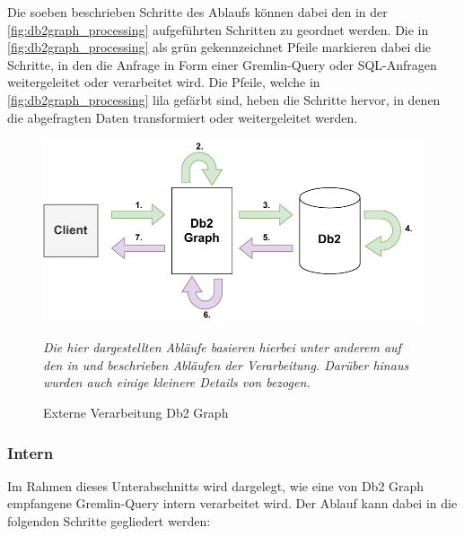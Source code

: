 Die soeben beschrieben Schritte des Ablaufs können dabei den in der \autoref{fig:db2graph_processing} aufgeführten Schritten zu geordnet werden. Die in \autoref{fig:db2graph_processing} als grün gekennzeichnet Pfeile markieren dabei die Schritte, in den die Anfrage in Form einer Gremlin-Query oder SQL-Anfragen weitergeleitet oder verarbeitet wird. Die Pfeile, welche in \autoref{fig:db2graph_processing} lila gefärbt sind, heben die Schritte hervor, in denen die abgefragten Daten transformiert oder weitergeleitet werden.

\begin{figure}[h]
    \centering
    \includegraphics[width=\textwidth]{images/db2graph_processing.pdf}
    \caption{Externe Verarbeitung Db2 Graph}
    \label{fig:db2graph_processing}
    \vspace{1em}
    \textit{Die hier dargestellten Abläufe basieren hierbei unter anderem auf den in \cite{vldb_tian} und \cite{sigmod_tian} beschrieben Abläufen der Verarbeitung. Darüber hinaus wurden auch einige kleinere Details von \cite{tinkerpop_2020} bezogen.} 
\end{figure}

\subsubsection{Intern}
Im Rahmen dieses Unterabschnitts wird dargelegt, wie eine von Db2 Graph empfangene Gremlin-Query intern verarbeitet wird. Der Ablauf kann dabei in die folgenden Schritte gegliedert werden: 

